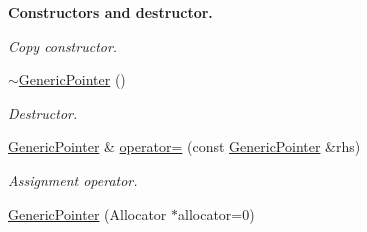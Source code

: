 \begin{Indent}{\bf Constructors and destructor.}
\begin{DoxyCompactItemize}
\begin{DoxyCompactList}\small\item\em Copy constructor. \end{DoxyCompactList}\item 
\hyperlink{class_generic_pointer_acf3eb2f7c4ebf9256f638aafa17534cb}{$\sim$\+Generic\+Pointer} ()\hypertarget{class_generic_pointer_acf3eb2f7c4ebf9256f638aafa17534cb}{}\label{class_generic_pointer_acf3eb2f7c4ebf9256f638aafa17534cb}

\begin{DoxyCompactList}\small\item\em Destructor. \end{DoxyCompactList}\item 
\hyperlink{class_generic_pointer}{Generic\+Pointer} \& \hyperlink{class_generic_pointer_a1d0174a6e72daa4024da9e08ce1e7951}{operator=} (const \hyperlink{class_generic_pointer}{Generic\+Pointer} \&rhs)\hypertarget{class_generic_pointer_a1d0174a6e72daa4024da9e08ce1e7951}{}\label{class_generic_pointer_a1d0174a6e72daa4024da9e08ce1e7951}

\begin{DoxyCompactList}\small\item\em Assignment operator. \end{DoxyCompactList}\item 
\hyperlink{class_generic_pointer_a5d85b7dc82719643e8f7adccd5a74fbe}{Generic\+Pointer} (Allocator $\ast$allocator=0)\hypertarget{class_generic_pointer_a5d85b7dc82719643e8f7adccd5a74fbe}{}\label{class_generic_pointer_a5d85b7dc82719643e8f7adccd5a74fbe}


\end{DoxyCompactItemize}
\end{Indent}

